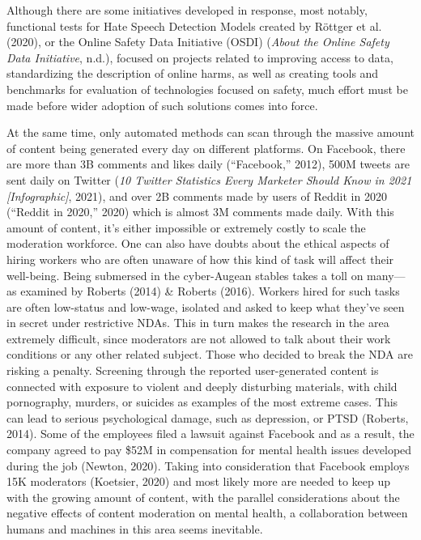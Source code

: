 \documentclass[
  10pt,
  dvipsnames,enabledeprecatedfontcommands]{scrartcl}
\begin{document}
Although there are some initiatives developed in response, most notably,
functional tests for Hate Speech Detection Models created by Röttger et
al. (2020), or the Online Safety Data Initiative (OSDI) (\emph{About the
Online Safety Data Initiative}, n.d.), focused on projects related to
improving access to data, standardizing the description of online harms,
as well as creating tools and benchmarks for evaluation of technologies
focused on safety, much effort must be made before wider adoption of
such solutions comes into force.

At the same time, only automated methods can scan through the massive
amount of content being generated every day on different platforms. On
Facebook, there are more than 3B comments and likes daily
({``Facebook,''} 2012), 500M tweets are sent daily on Twitter (\emph{10
{Twitter} {Statistics} {Every} {Marketer} {Should} {Know} in 2021
{[}{Infographic}{]}}, 2021), and over 2B comments made by users of
Reddit in 2020 ({``Reddit in 2020,''} 2020) which is almost 3M comments
made daily. With this amount of content, it's either impossible or
extremely costly to scale the moderation workforce. One can also have
doubts about the ethical aspects of hiring workers who are often unaware
of how this kind of task will affect their well-being. Being submersed
in the cyber-Augean stables takes a toll on many---as examined by
Roberts (2014) \& Roberts (2016). Workers hired for such tasks are often
low-status and low-wage, isolated and asked to keep what they've seen in
secret under restrictive NDAs. This in turn makes the research in the
area extremely difficult, since moderators are not allowed to talk about
their work conditions or any other related subject. Those who decided to
break the NDA are risking a penalty. Screening through the reported
user-generated content is connected with exposure to violent and deeply
disturbing materials, with child pornography, murders, or suicides as
examples of the most extreme cases. This can lead to serious
psychological damage, such as depression, or PTSD (Roberts, 2014). Some
of the employees filed a lawsuit against Facebook and as a result, the
company agreed to pay \$52M in compensation for mental health issues
developed during the job (Newton, 2020). Taking into consideration that
Facebook employs 15K moderators (Koetsier, 2020) and most likely more
are needed to keep up with the growing amount of content, with the
parallel considerations about the negative effects of content moderation
on mental health, a collaboration between humans and machines in this
area seems inevitable.
\end{document}
